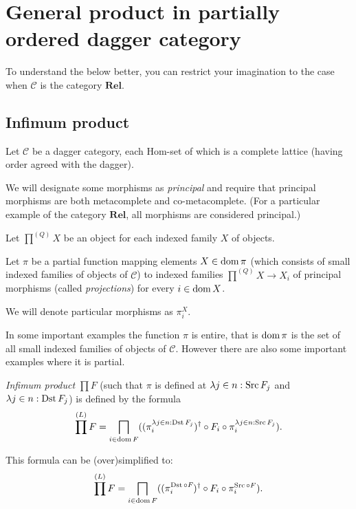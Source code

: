 \section{General product in partially ordered dagger category}

To understand the below better, you can restrict your imagination to the case
when $\mathcal{C}$ is the category $\mathbf{Rel}$.

\subsection{Infimum product}

Let $\mathcal{C}$ be a dagger category, each Hom-set of which is a complete
lattice (having order agreed with the dagger).

We will designate some morphisms as \emph{principal} and require that
principal morphisms are both metacomplete and co-metacomplete. (For a
particular example of the category $\mathbf{Rel}$, all morphisms are
considered principal.)

Let $\prod^{(Q)} X$ be an object for each indexed family $X$ of objects.

Let $\pi$ be a partial function mapping elements $X \in \operatorname{dom} \pi$ (which
consists of small indexed families of objects of $\mathcal{C}$) to indexed
families $\prod^{(Q)} X \rightarrow X_i$ of principal morphisms (called
\emph{projections}) for every $i \in \operatorname{dom} X$.

We will denote particular morphisms as $\pi^X_i$.

\begin{rem}
  In some important examples the function $\pi$ is entire, that is $\operatorname{dom}
  \pi$ is the set of all small indexed families of objects of $\mathcal{C}$.
  However there are also some important examples where it is partial.
\end{rem}

\begin{defn}
  \emph{Infimum product} $\prod F$ (such that $\pi$ is defined at $\lambda
  j \in n : \operatorname{Src} F_j$ and $\lambda j \in n : \operatorname{Dst} F_j$) is defined
  by the formula
  \[ \prod^{(L)} F = \bigsqcap_{i \in \operatorname{dom} F} ((\pi^{\lambda j \in n :
     \operatorname{Dst} F_j}_i)^{\dagger} \circ F_i \circ \pi^{\lambda j \in n :
     \operatorname{Src} F_j}_i) . \]
\end{defn}

This formula can be (over)simplified to:
\[ \prod^{(L)} F = \bigsqcap_{i \in \operatorname{dom} F} ((\pi^{\operatorname{Dst} \circ
   F_{}}_i)^{\dagger} \circ F_i \circ \pi^{\operatorname{Src} \circ F}_i) . \]

